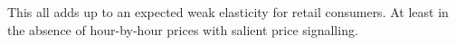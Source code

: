This all adds up to an expected weak elasticity for retail consumers. At least in the absence of hour-by-hour prices with salient price signalling.


